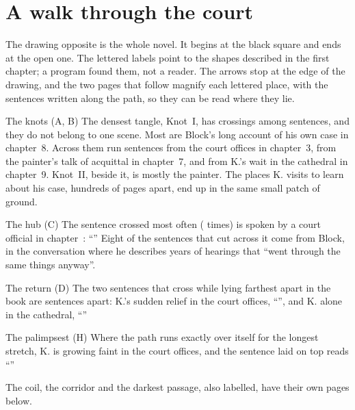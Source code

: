 \clearpage
\section{A walk through the court}

The drawing opposite is the whole novel. It begins at the black square and
ends at the open one. The lettered labels point to the shapes described in the
first chapter; a program found them, not a reader. The arrows stop at the edge
of the drawing, and the two pages that follow magnify each lettered place, with
the sentences written along the path, so they can be read where they lie.

\begin{finding}{The knots (A, B)} The densest tangle, Knot~I, has
 crossings among  sentences, and they do
not belong to one scene. Most are Block's long account of his own case in
chapter~8. Across them run sentences from the court offices in chapter~3, from
the painter's talk of acquittal in chapter~7, and from K.'s wait in the
cathedral in chapter~9. Knot~II, beside it, is mostly the painter. The places
K. visits to learn about his case, hundreds of pages apart, end up in the same
small patch of ground.
\end{finding}

\begin{finding}{The hub (C)} The sentence crossed most often ( times)
is spoken by a court official in chapter~: ``''
Eight of the sentences that cut across it come from Block, in the
conversation where he describes years of hearings that ``went through the
same things anyway''.
\end{finding}

\begin{finding}{The return (D)} The two sentences that cross while lying farthest
apart in the book are  sentences apart: K.'s sudden relief in the
court offices, ``'', and K. alone in the cathedral,
``''
\end{finding}

\begin{finding}{The palimpsest (H)} Where the path runs exactly over itself for
the longest stretch, K. is growing faint in the court offices, and the
sentence laid on top reads ``''
\end{finding}

\noindent The coil, the corridor and the darkest passage, also labelled, have
their own pages below.

